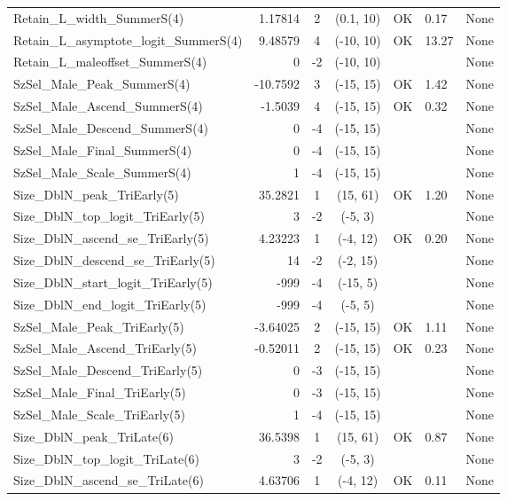 \documentclass[12pt,]{article}
\begin{document}
\begin{landscape}
\begin{longtable}{lrcccll}
  Retain\_L\_width\_SummerS(4) & 1.17814 & 2 & (0.1, 10) & OK & 0.17 & None \\ 
  Retain\_L\_asymptote\_logit\_SummerS(4) & 9.48579 & 4 & (-10, 10) & OK & 13.27 & None \\ 
  Retain\_L\_maleoffset\_SummerS(4) & 0 & -2 & (-10, 10) &  &  & None \\ 
  SzSel\_Male\_Peak\_SummerS(4) & -10.7592 & 3 & (-15, 15) & OK & 1.42 & None \\ 
  SzSel\_Male\_Ascend\_SummerS(4) & -1.5039 & 4 & (-15, 15) & OK & 0.32 & None \\ 
  SzSel\_Male\_Descend\_SummerS(4) & 0 & -4 & (-15, 15) &  &  & None \\ 
  SzSel\_Male\_Final\_SummerS(4) & 0 & -4 & (-15, 15) &  &  & None \\ 
  SzSel\_Male\_Scale\_SummerS(4) & 1 & -4 & (-15, 15) &  &  & None \\ 
  Size\_DblN\_peak\_TriEarly(5) & 35.2821 & 1 & (15, 61) & OK & 1.20 & None \\ 
  Size\_DblN\_top\_logit\_TriEarly(5) & 3 & -2 & (-5, 3) &  &  & None \\ 
  Size\_DblN\_ascend\_se\_TriEarly(5) & 4.23223 & 1 & (-4, 12) & OK & 0.20 & None \\ 
  Size\_DblN\_descend\_se\_TriEarly(5) & 14 & -2 & (-2, 15) &  &  & None \\ 
  Size\_DblN\_start\_logit\_TriEarly(5) & -999 & -4 & (-15, 5) &  &  & None \\ 
  Size\_DblN\_end\_logit\_TriEarly(5) & -999 & -4 & (-5, 5) &  &  & None \\ 
  SzSel\_Male\_Peak\_TriEarly(5) & -3.64025 & 2 & (-15, 15) & OK & 1.11 & None \\ 
  SzSel\_Male\_Ascend\_TriEarly(5) & -0.52011 & 2 & (-15, 15) & OK & 0.23 & None \\ 
  SzSel\_Male\_Descend\_TriEarly(5) & 0 & -3 & (-15, 15) &  &  & None \\ 
  SzSel\_Male\_Final\_TriEarly(5) & 0 & -3 & (-15, 15) &  &  & None \\ 
  SzSel\_Male\_Scale\_TriEarly(5) & 1 & -4 & (-15, 15) &  &  & None \\ 
  Size\_DblN\_peak\_TriLate(6) & 36.5398 & 1 & (15, 61) & OK & 0.87 & None \\ 
  Size\_DblN\_top\_logit\_TriLate(6) & 3 & -2 & (-5, 3) &  &  & None \\ 
  Size\_DblN\_ascend\_se\_TriLate(6) & 4.63706 & 1 & (-4, 12) & OK & 0.11 & None \\ 

\end{longtable}
\end{landscape}
\end{document}
